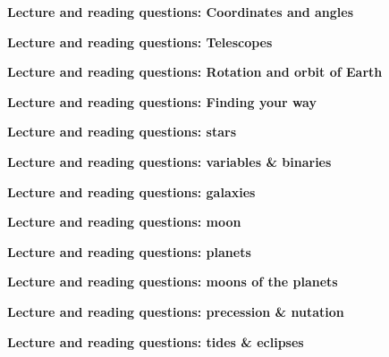 \documentclass[11pt, preprint, twoside]{aastex}
\newcounter{thelecs}
\begin{document}


\clearpage
%



\cleardoublepage



\setcounter{thelecs}{0}

\cleardoublepage

\noindent
{\hfill \Large {\bf Lecture and reading questions: Coordinates and angles} \hfill}


\cleardoublepage
{}
\noindent
{\hfill \Large {\bf Lecture and reading questions: Telescopes} \hfill}


\cleardoublepage
{}
\noindent
{\hfill \Large {\bf Lecture and reading questions: Rotation and orbit of
  Earth} \hfill}


\cleardoublepage
{}
\noindent
{\hfill \Large {\bf Lecture and reading questions: Finding your way} \hfill}

% 

\cleardoublepage
{}
\noindent
{\hfill \Large {\bf Lecture and reading questions: stars} \hfill}


\cleardoublepage
{}
\noindent
{\hfill \Large {\bf Lecture and reading questions: variables \& binaries} \hfill}


\cleardoublepage
{}
\noindent
{\hfill \Large {\bf Lecture and reading questions: galaxies} \hfill}
 

\cleardoublepage
{}
\noindent
{\hfill \Large {\bf Lecture and reading questions: moon} \hfill}


\cleardoublepage
{}
\noindent
{\hfill \Large {\bf Lecture and reading questions: planets} \hfill}


\cleardoublepage
{}
\noindent
{\hfill \Large {\bf Lecture and reading questions: moons of the planets} \hfill}


\cleardoublepage
{}
\noindent
{\hfill \Large {\bf Lecture and reading questions: precession \&
    nutation} \hfill}


\cleardoublepage
{}
\noindent
{\hfill \Large {\bf Lecture and reading questions: tides \& eclipses} \hfill}

\end{document}
